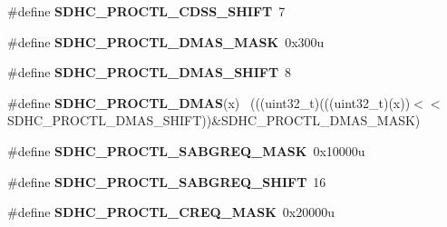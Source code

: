 \begin{DoxyCompactItemize}
\item 
\hypertarget{group___s_d_h_c___register___masks_ga9c25c726f9cf08d6cf3dc9dd8b56f02f}{}\#define {\bfseries S\+D\+H\+C\+\_\+\+P\+R\+O\+C\+T\+L\+\_\+\+C\+D\+S\+S\+\_\+\+S\+H\+I\+F\+T}~7\label{group___s_d_h_c___register___masks_ga9c25c726f9cf08d6cf3dc9dd8b56f02f}

\item 
\hypertarget{group___s_d_h_c___register___masks_ga100c5b53357ad23fabd0976fbac43ff4}{}\#define {\bfseries S\+D\+H\+C\+\_\+\+P\+R\+O\+C\+T\+L\+\_\+\+D\+M\+A\+S\+\_\+\+M\+A\+S\+K}~0x300u\label{group___s_d_h_c___register___masks_ga100c5b53357ad23fabd0976fbac43ff4}

\item 
\hypertarget{group___s_d_h_c___register___masks_ga934c05067b80924d6afa525d338e7529}{}\#define {\bfseries S\+D\+H\+C\+\_\+\+P\+R\+O\+C\+T\+L\+\_\+\+D\+M\+A\+S\+\_\+\+S\+H\+I\+F\+T}~8\label{group___s_d_h_c___register___masks_ga934c05067b80924d6afa525d338e7529}

\item 
\hypertarget{group___s_d_h_c___register___masks_ga35753d769b933c12ee3981e69cdd3650}{}\#define {\bfseries S\+D\+H\+C\+\_\+\+P\+R\+O\+C\+T\+L\+\_\+\+D\+M\+A\+S}(x)                                        ~(((uint32\+\_\+t)(((uint32\+\_\+t)(x))$<$$<$S\+D\+H\+C\+\_\+\+P\+R\+O\+C\+T\+L\+\_\+\+D\+M\+A\+S\+\_\+\+S\+H\+I\+F\+T))\&S\+D\+H\+C\+\_\+\+P\+R\+O\+C\+T\+L\+\_\+\+D\+M\+A\+S\+\_\+\+M\+A\+S\+K)\label{group___s_d_h_c___register___masks_ga35753d769b933c12ee3981e69cdd3650}

\item 
\hypertarget{group___s_d_h_c___register___masks_gab4bb75efee8a2303ff47f441630f7d3f}{}\#define {\bfseries S\+D\+H\+C\+\_\+\+P\+R\+O\+C\+T\+L\+\_\+\+S\+A\+B\+G\+R\+E\+Q\+\_\+\+M\+A\+S\+K}~0x10000u\label{group___s_d_h_c___register___masks_gab4bb75efee8a2303ff47f441630f7d3f}

\item 
\hypertarget{group___s_d_h_c___register___masks_ga124dcc1ca07a3d3e8600609fa80d9496}{}\#define {\bfseries S\+D\+H\+C\+\_\+\+P\+R\+O\+C\+T\+L\+\_\+\+S\+A\+B\+G\+R\+E\+Q\+\_\+\+S\+H\+I\+F\+T}~16\label{group___s_d_h_c___register___masks_ga124dcc1ca07a3d3e8600609fa80d9496}

\item 
\hypertarget{group___s_d_h_c___register___masks_ga6278901eea66f3db196739c4dc820644}{}\#define {\bfseries S\+D\+H\+C\+\_\+\+P\+R\+O\+C\+T\+L\+\_\+\+C\+R\+E\+Q\+\_\+\+M\+A\+S\+K}~0x20000u\label{group___s_d_h_c___register___masks_ga6278901eea66f3db196739c4dc820644}


\end{DoxyCompactItemize}
